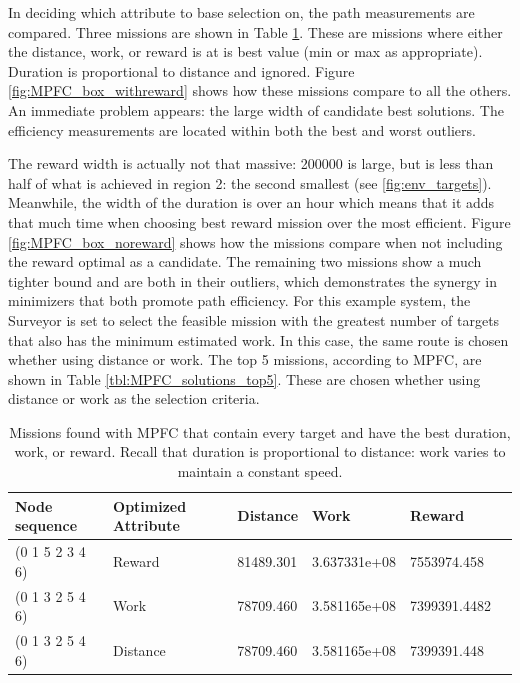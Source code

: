 \documentclass{tamuccthesis}
\begin{document}
In deciding which attribute to base selection on, the path measurements are compared. Three missions are shown in Table \ref{tbl:MPFC_solutions}. These are missions where either the distance, work, or reward is at is best value (min or max as appropriate). Duration is proportional to distance and ignored. Figure \ref{fig:MPFC_box_withreward} shows how these missions compare to all the others. An immediate problem appears: the large width of candidate best solutions. The efficiency measurements are located within both the best and worst outliers. 

The reward width is actually not that massive: 200000 is large, but is less than half of what is achieved in region 2: the second smallest (see \Figure \ref{fig:env_targets}). Meanwhile, the width of the duration is over an hour which means that it adds that much time when choosing best reward mission over the most efficient. Figure \ref{fig:MPFC_box_noreward} shows how the missions compare when not including the reward optimal as a candidate. The remaining two missions show a much tighter bound and are both in their outliers, which demonstrates the synergy in minimizers that both promote path efficiency. For this example system, the Surveyor is set to select the feasible mission with the greatest number of targets that also has the minimum estimated work. In this case, the same route is chosen whether using distance or work. The top 5 missions, according to MPFC, are shown in Table \ref{tbl:MPFC_solutions_top5}. These are chosen whether using distance or work as the selection criteria.

\begin{table}[H]\small
    \begin{tabular}{|l|l|l|l|l|l|}
\hline
Node sequence & Optimized Attribute & Distance & Work & Reward \\
\hline
(0 1 5 2 3 4 6) & Reward   & 81489.301 & 3.637331e+08 & 7553974.458 \\
\hline
(0 1 3 2 5 4 6) & Work     & 78709.460 & 3.581165e+08 & 7399391.4482 \\
\hline
(0 1 3 2 5 4 6) & Distance & 78709.460 & 3.581165e+08  & 7399391.448 \\
\hline
    \end{tabular}
    \caption[Mission Planner Fully-Connected results.]{Missions found with MPFC that contain every target and have the best duration, work, or reward. Recall that duration is proportional to distance: work varies to maintain a constant speed.}
    \label{tbl:MPFC_solutions}
\end{table}
\end{document}

